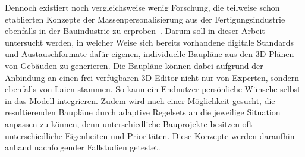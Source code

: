 Dennoch existiert noch vergleichsweise wenig Forschung, die teilweise schon etablierten Konzepte der Massenpersonalisierung aus der Fertigungsindustrie ebenfalls in der Bauindustrie zu erproben~\cite{Larsen2019}.
Darum soll in dieser Arbeit untersucht werden, in welcher Weise sich bereits vorhandene digitale Standards und Austauschformate dafür eigenen, individuelle Baupläne aus den 3D Plänen von Gebäuden zu generieren.
Die Baupläne können dabei aufgrund der Anbindung an einen frei verfügbaren 3D Editor nicht nur von Experten, sondern ebenfalls von Laien stammen.
So kann ein Endnutzer persönliche Wünsche selbst in das Modell integrieren.
Zudem wird nach einer Möglichkeit gesucht, die resultierenden Baupläne durch adaptive Regelsets an die jeweilige Situation anpassen zu können, denn unterschiedliche Bauprojekte besitzen oft unterschiedliche Eigenheiten und Prioritäten.
Diese Konzepte werden daraufhin anhand nachfolgender Fallstudien getestet.